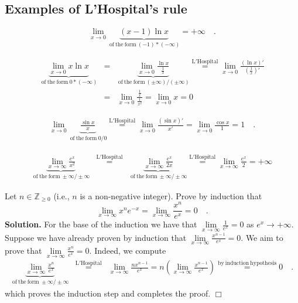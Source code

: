 \documentclass[12pt]{book}
\newenvironment{solution}{\textbf{Solution.} }{$\Box$}
\begin{document}
\subsection{Examples of L'Hospital's rule}
\[
\lim\limits_{x\to 0} \underbrace{(x-1)\ln x}_{\mathrm{~of~the~form~}(-1)*(-\infty)} =+\infty\quad .
\]

\[\begin{array}{rcl}
\underbrace{\lim\limits_{x\to 0} x\ln x}_{\mathrm{~of~the~form~}0*(-\infty)} &=&\underbrace{\lim\limits_{x\to 0} \frac{\ln x}{\frac{1}{x}}}_{\mathrm{~of~the~form~}(\pm\infty)/(\pm\infty)}\stackrel{\mathrm{L'Hospital}}{=}\lim\limits_{x\to 0} \frac{(\ln x)'}{\left(\frac{1}{x}\right)'}\\&=& \lim\limits_{x\to 0} \frac{\frac{1}{x}}{\frac{1}{x^2}}=  \lim\limits_{x\to 0} x =0
\end{array}
\]

\[
\begin{array}{rcl}
\lim\limits_{x\to 0} \underbrace{\frac{\sin x}x}_{\mathrm{~of~the~form~}0/0}\stackrel{\mathrm{L'Hospital}}{=} \lim\limits_{x\to 0} \frac{(\sin x)'}{x'}= \lim\limits_{x\to 0} \frac{\cos x}{1}= 1\quad .
\end{array}
\]

\[
\begin{array}{rcl}
\underbrace{\lim\limits_{x\to \infty} \frac{e^x}{x^2}}_{\mathrm{~of~the~form~}\pm \infty/\pm\infty} &\stackrel{\mathrm{L'Hospital}}{=} & \underbrace{\lim\limits_{x\to \infty} \frac{e^x}{2x}}_{\mathrm{~of~the~form~}\pm \infty/\pm\infty}\stackrel{\mathrm{L'Hospital}}{=}\lim\limits_{x\to \infty} \frac{e^x}{2}= +\infty
\end{array}
\]

Let $n\in \mathbb Z_{\geq 0}$ (i.e., $n$ is a non-negative integer). Prove by induction that 
\begin{equation}\label{eqLimiteMinusXtimesxtoNth}
\lim\limits_{x\to \infty} x^ne^{-x} = \lim\limits_{x\to \infty}\frac{ x^n}{e^{x}}=0\quad .
\end{equation}
\begin{solution}
For the base of the induction we have that $\lim\limits_{x\to \infty}\frac{1}{e^{x}}=0$ as $e^x\to +\infty$. Suppose we have already proven by induction that $ \lim\limits_{x\to \infty}\frac{x^{n-1}}{e^{x}}=0$. We aim to prove that $ \lim\limits_{x\to \infty}\frac{x^{n}}{e^{x}}=0$. Indeed, we compute
\[
\begin{array}{rcl}
\underbrace{\lim\limits_{x\to \infty} \frac{x^n}{e^x}}_{\mathrm{~of~the~form~}\pm \infty/\pm\infty} &\stackrel{\mathrm{L'Hospital}}{=} & \lim\limits_{x\to \infty} \frac{nx^{n-1}}{e^x}=n\left( \lim\limits_{x\to \infty} \frac{x^{n-1}}{e^x}\right) \stackrel{\mathrm{by~induction~hypothesis}}{=}0\quad .
\end{array}
\]
which proves the induction step and completes the proof.
\end{solution}
\end{document}
